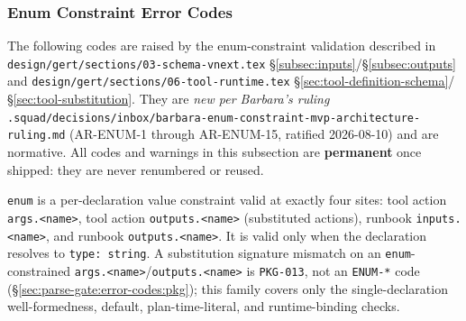 \subsubsection{Enum Constraint Error Codes}
\label{sec:parse-gate:error-codes:enum}

The following codes are raised by the enum-constraint validation described
in \texttt{design/gert/sections/03-schema-vnext.tex}
\S\ref{subsec:inputs}/\S\ref{subsec:outputs} and
\texttt{design/gert/sections/06-tool-runtime.tex}
\S\ref{sec:tool-definition-schema}/\S\ref{sec:tool-substitution}. They are
\emph{new per Barbara's ruling}
\texttt{.squad/decisions/inbox/barbara-enum-constraint-mvp-architecture-ruling.md}
(AR-ENUM-1 through AR-ENUM-15, ratified 2026-08-10) and are normative. All
codes and warnings in this subsection are \textbf{permanent} once shipped:
they are never renumbered or reused.

\texttt{enum} is a per-declaration value constraint valid at exactly four
sites: tool action \texttt{args.<name>}, tool action \texttt{outputs.<name>}
(substituted actions), runbook \texttt{inputs.<name>}, and runbook
\texttt{outputs.<name>}. It is valid only when the declaration resolves to
\texttt{type: string}. A substitution signature mismatch on an
\texttt{enum}-constrained \texttt{args.<name>}/\texttt{outputs.<name>} is
\texttt{PKG-013}, not an \texttt{ENUM-*} code
(\S\ref{sec:parse-gate:error-codes:pkg}); this family covers only the
single-declaration well-formedness, default, plan-time-literal, and
runtime-binding checks.


